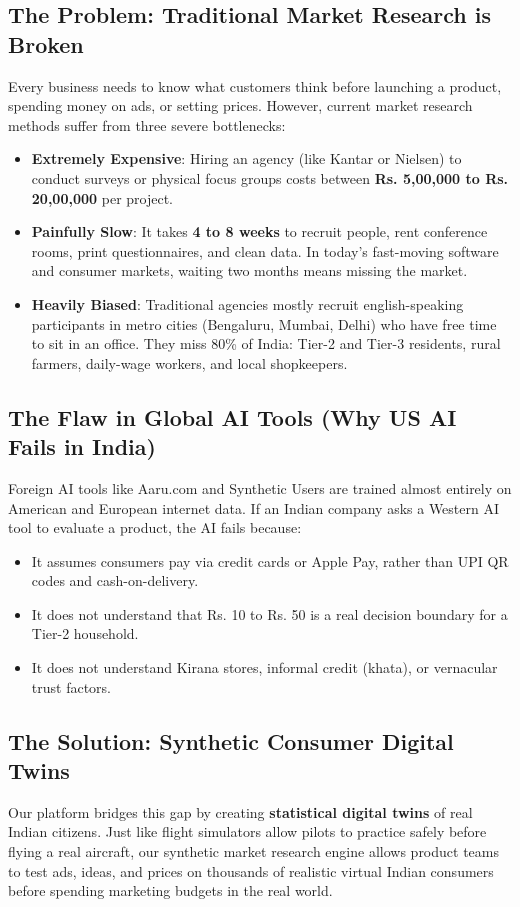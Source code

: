 \documentclass[11pt,a4paper]{article}
\begin{document}
\subsection{The Problem: Traditional Market Research is Broken}
Every business needs to know what customers think before launching a product, spending money on ads, or setting prices. However, current market research methods suffer from three severe bottlenecks:
\begin{itemize}[noitemsep]
  \item \textbf{Extremely Expensive}: Hiring an agency (like Kantar or Nielsen) to conduct surveys or physical focus groups costs between \textbf{Rs. 5,00,000 to Rs. 20,00,000} per project.
  \item \textbf{Painfully Slow}: It takes \textbf{4 to 8 weeks} to recruit people, rent conference rooms, print questionnaires, and clean data. In today's fast-moving software and consumer markets, waiting two months means missing the market.
  \item \textbf{Heavily Biased}: Traditional agencies mostly recruit english-speaking participants in metro cities (Bengaluru, Mumbai, Delhi) who have free time to sit in an office. They miss 80\% of India: Tier-2 and Tier-3 residents, rural farmers, daily-wage workers, and local shopkeepers.
\end{itemize}

\subsection{The Flaw in Global AI Tools (Why US AI Fails in India)}
Foreign AI tools like Aaru.com and Synthetic Users are trained almost entirely on American and European internet data. If an Indian company asks a Western AI tool to evaluate a product, the AI fails because:
\begin{itemize}[noitemsep]
  \item It assumes consumers pay via credit cards or Apple Pay, rather than UPI QR codes and cash-on-delivery.
  \item It does not understand that Rs. 10 to Rs. 50 is a real decision boundary for a Tier-2 household.
  \item It does not understand Kirana stores, informal credit (khata), or vernacular trust factors.
\end{itemize}

\subsection{The Solution: Synthetic Consumer Digital Twins}
Our platform bridges this gap by creating \textbf{statistical digital twins} of real Indian citizens. Just like flight simulators allow pilots to practice safely before flying a real aircraft, our synthetic market research engine allows product teams to test ads, ideas, and prices on thousands of realistic virtual Indian consumers before spending marketing budgets in the real world.
\end{document}
